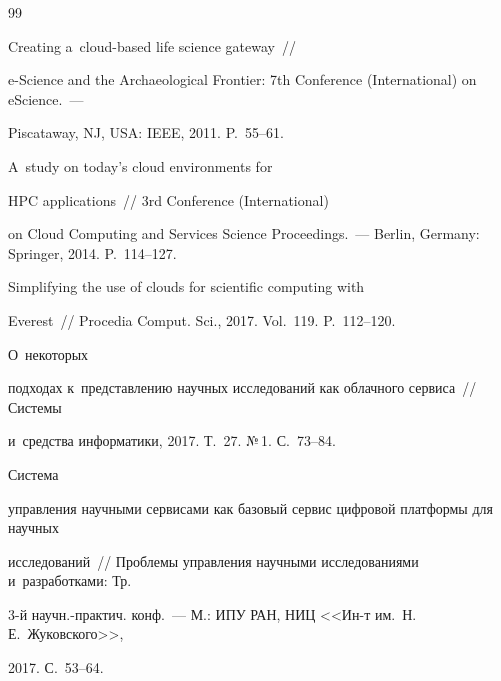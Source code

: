 {\small\frenchspacing

{%


\begin{thebibliography}{99}




 Creating a~cloud-based life science gateway~/\!\!/\linebreak 

e-Science and the Archaeological Frontier: 7th Conference (International) on eScience.~--- 

Piscataway, NJ, USA: IEEE, 2011. P.~55--61.




 A~study on today's cloud environments for 

HPC applications~/\!\!/ 3rd Conference (International) 

on Cloud Computing and Services Science Proceedings.~--- Berlin, Germany: Springer, 2014. P.~114--127.


 Simplifying the use of clouds for scientific computing with 

Everest~/\!\!/ Procedia Comput. Sci., 2017. Vol.~119. P.~112--120.




 О~некоторых 

подходах к~представлению научных исследований как облачного сервиса~/\!\!/ Системы 

и~средства информатики, 2017. Т.~27. №\,1. С.~73--84.


 Система 

управления научными сервисами как базовый сервис цифровой платформы для научных 

исследований~/\!\!/ Проблемы управления научными исследованиями и~разработками: Тр. 

3-й научн.-практич. конф.~--- М.: ИПУ РАН, НИЦ <<Ин-т им.\ Н.\,Е.~Жуковского>>, 

2017. С.~53--64.


\end{thebibliography}}}
